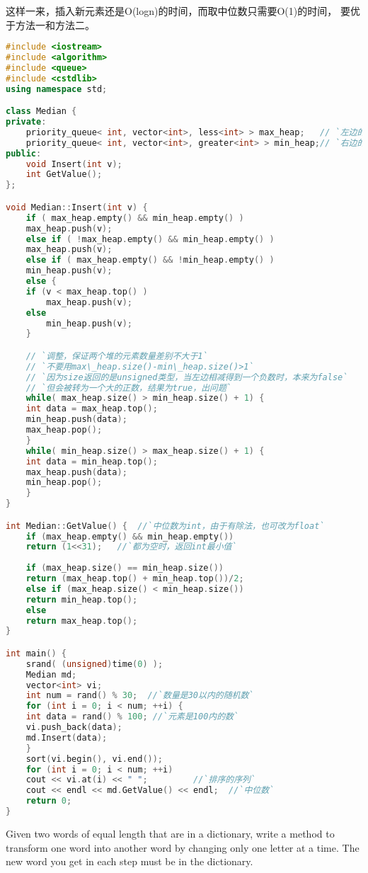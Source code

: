 \begin{description}
\begin{description}
这样一来，插入新元素还是O(logn)的时间，而取中位数只需要O(1)的时间， 要优于方法一和方法二。
\end{description}
\begin{lstlisting}[language=C++]
#include <iostream>
#include <algorithm>
#include <queue>
#include <cstdlib>
using namespace std;

class Median {
private:
    priority_queue< int, vector<int>, less<int> > max_heap;   // `左边的数`
    priority_queue< int, vector<int>, greater<int> > min_heap;// `右边的数`
public:
    void Insert(int v);
    int GetValue();
};

void Median::Insert(int v) {
    if ( max_heap.empty() && min_heap.empty() )
	max_heap.push(v);
    else if ( !max_heap.empty() && min_heap.empty() )
	max_heap.push(v);
    else if ( max_heap.empty() && !min_heap.empty() )
	min_heap.push(v);
    else {
	if (v < max_heap.top() )
	    max_heap.push(v);
	else
	    min_heap.push(v);
    }

    // `调整，保证两个堆的元素数量差别不大于1`
    // `不要用max\_heap.size()-min\_heap.size()>1`
    // `因为size返回的是unsigned类型，当左边相减得到一个负数时，本来为false`
    // `但会被转为一个大的正数，结果为true，出问题`
    while( max_heap.size() > min_heap.size() + 1) {
	int data = max_heap.top();
	min_heap.push(data);
	max_heap.pop();
    }
    while( min_heap.size() > max_heap.size() + 1) {
	int data = min_heap.top();
	max_heap.push(data);
	min_heap.pop();
    }
}

int Median::GetValue() {  //`中位数为int，由于有除法，也可改为float`
    if (max_heap.empty() && min_heap.empty())
	return (1<<31);   //`都为空时，返回int最小值`
    
    if (max_heap.size() == min_heap.size()) 
	return (max_heap.top() + min_heap.top())/2;
    else if (max_heap.size() < min_heap.size())
	return min_heap.top();
    else
	return max_heap.top();
}

int main() {
    srand( (unsigned)time(0) );
    Median md;
    vector<int> vi;
    int num = rand() % 30;  //`数量是30以内的随机数`
    for (int i = 0; i < num; ++i) {
	int data = rand() % 100; //`元素是100内的数`
	vi.push_back(data);
	md.Insert(data);
    }
    sort(vi.begin(), vi.end());
    for (int i = 0; i < num; ++i)
	cout << vi.at(i) << " ";         //`排序的序列`
    cout << endl << md.GetValue() << endl;  //`中位数`
    return 0;
}
\end{lstlisting}
%


\item[20.10] Given two words of equal length that are in a dictionary, write a method to transform one word into another word by changing only one letter at a time. The new word you get in each step must be in the dictionary.


\end{description}
